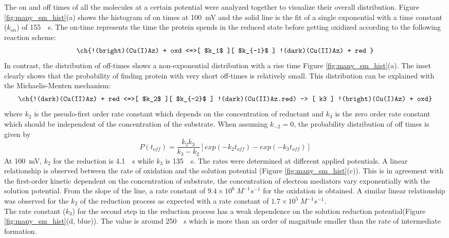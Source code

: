 \documentclass[journal=jacsat,manuscript=article]{achemso}
\begin{document}
The on and off times of all the molecules at a certain potential were analyzed together to visualize their overall distribution.
Figure \ref{fig:many_sm_hist}(a) shows the histogram of on times at \SI{100}{\mV} and the solid line is the fit of a single exponential with a time constant ($k_{on}$) of \SI{155}{\per\s}.
The on-time represents the time the protein spends in the reduced state before getting oxidized according to the following reaction scheme:
\begin{align}
	\ch{!(bright)(Cu(I)Az) + oxd <=>[ $k_1$ ][ $k_{-1}$ ] !(dark)(Cu(II)Az) + red }
	\label{eq:oxidation}
\end{align}
In contrast, the distribution of off-times shows a non-exponential distribution with a rise time Figure \ref{fig:many_sm_hist}(a).
The inset clearly shows that the probability of finding protein with very short off-times is relatively small.
This distribution can be explained with the Michaelis-Menten mechanism:
\begin{align}
	\ch{!(dark)(Cu(II)Az) + red <=>[ $k_2$ ][ $k_{-2}$ ] !(dark)(Cu(II)Az.red) -> [ k3 ] !(bright)(Cu(I)Az) + oxd}
	\label{eq:reduction}
\end{align}
where $k_2$ is the pseudo-first order rate constant which depends on the concentration of reductant and $k_3$ is the zero order rate constant which should be independent of the concentration of the substrate.
When assuming $k_{-2}=0$, the probability distribution of off times is given by\cite{lu1998single-molecule}
\begin{equation}
	P(t_{off}) = \frac{k_2k_3}{k_3-k_2} [exp(-k_2t_{off})-exp(-k_3t_{off})]
	\label{eq:2exp_risetime}
\end{equation}
At \SI{100}{\mV}, $k_2$ for the reduction is \SI{4.1}{\per\s} while $k_3$ is \SI{135}{\per\s}.
The rates were determined at different applied potentials.
A linear relationship is observed between the rate of oxidation and the solution potential (Figure \ref{fig:many_sm_hist}(c)).
This is in agreement with the first-order kinetic dependent on the concentration of substrate, the concentration of electron mediators vary exponentially with the solution potential. 
From the slope of the line, a rate constant of $9.4\times10^6~M^{-1}s^{-1}$ for the oxidation is obtained.
A similar linear relationship was observed for the $k_2$ of the reduction process as expected with a rate constant of $1.7\times10^5~M^{-1}s^{-1}$.\\

The rate constant ($k_3$) for the second step in the reduction process has a weak dependence on the solution reduction potential(Figure \ref{fig:many_sm_hist}(d, blue)).
The value is around \SI{250}{\per\s} which is more than an order of magnitude smaller than the rate of intermediate formation.\\
\end{document}

